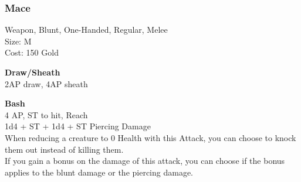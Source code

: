 \subsubsection{Mace}\label{weapon:mace}
Weapon, Blunt, One-Handed, Regular, Melee\\
Size: M\\
Cost: 150 Gold

\textbf{Draw/Sheath}\\
2AP draw, 4AP sheath

\textbf{Bash}\\
4 AP, ST to hit,  Reach\\
1d4 + \texttimes ST + 1d4 + \texttimes ST Piercing Damage\\
When reducing a creature to 0 Health with this Attack, you can choose to knock them out instead of killing them.\\
If you gain a bonus on the damage of this attack, you can choose if the bonus applies to the blunt damage or the piercing damage.